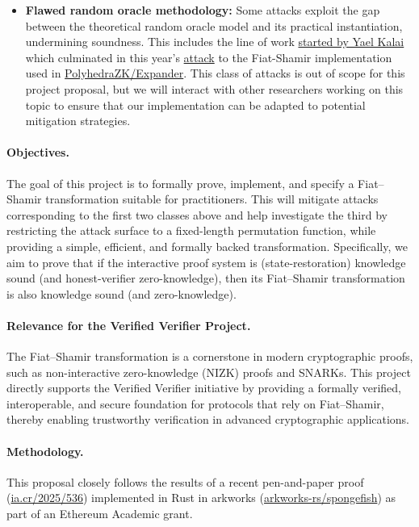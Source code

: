 \documentclass{article}
\begin{document}
\begin{itemize}
    \item \textbf{Flawed random oracle methodology:} Some attacks exploit the gap between the theoretical random oracle model and its practical instantiation, undermining soundness. This includes the line of work \href{https://dl.acm.org/doi/10.5555/946243.946302}{started by Yael Kalai} which culminated in this year's \href{https://eprint.iacr.org/2025/118}{attack} to the Fiat-Shamir implementation used in \href{https://github.com/PolyhedraZK/Expander/}{PolyhedraZK/Expander}. This class of attacks is out of scope for this project proposal, but we will interact with other researchers working on this topic to ensure that our implementation can be adapted to potential mitigation strategies.
\end{itemize}


\paragraph{Objectives.}
The goal of this project is to formally prove, implement, and specify a Fiat--Shamir transformation suitable for practitioners. This will mitigate attacks corresponding to the first two classes above and help investigate the third by restricting the attack surface to a fixed-length permutation function, while providing a simple, efficient, and formally backed transformation.
Specifically, we aim to prove that if the interactive proof system is (state-restoration) knowledge sound (and honest-verifier zero-knowledge), then its Fiat--Shamir transformation is also knowledge sound (and zero-knowledge).



\paragraph{Relevance for the Verified Verifier Project.} The Fiat--Shamir transformation is a cornerstone in modern cryptographic proofs, such as non-interactive zero-knowledge (NIZK) proofs and SNARKs. This project directly supports the Verified Verifier initiative by providing a formally verified, interoperable, and secure foundation for protocols that rely on Fiat--Shamir, thereby enabling trustworthy verification in advanced cryptographic applications.


\paragraph{Methodology.}
This proposal closely follows the results of a recent pen-and-paper proof (\href{https://eprint.iacr.org/2025/536.pdf}{ia.cr/2025/536}) implemented in Rust in arkworks (\href{https://github.com/arkworks-rs/spongefish}{arkworks-rs/spongefish}) as part of an Ethereum Academic grant.
\end{document}
